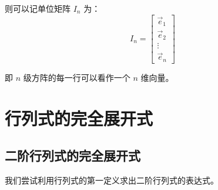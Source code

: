 则可以记单位矩阵 $I_n$ 为：
$$
I_n =
\begin{bmatrix}
	\vec e_1 \\ \vec e_2 \\ \vdots \\ \vec e_n
\end{bmatrix}
$$

即 $n$ 级方阵的每一行可以看作一个 $n$ 维向量。

\section{行列式的完全展开式}

\subsection{二阶行列式的完全展开式}

我们尝试利用行列式的第一定义求出二阶行列式的表达式。


